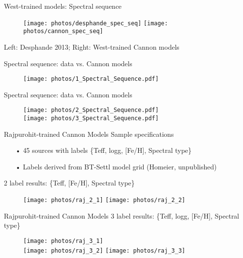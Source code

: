 \documentclass[compress]{beamer}
\begin{document}
\begin{frame}{West-trained models: Spectral sequence}
\begin{figure}
	\texttt{[image: photos/desphande\_spec\_seq]} 
	\texttt{[image: photos/cannon\_spec\_seq]} 
\end{figure}
\small \textcolor{sthlmDarkGreen}{Left}: Desphande 2013; \textcolor{sthlmDarkGreen}{Right}: West-trained Cannon models
\end{frame}


\begin{frame}{Spectral sequence: data vs. Cannon models}
\begin{figure}
	\texttt{[image: photos/1\_Spectral\_Sequence.pdf]} 
\end{figure}
\end{frame}


\begin{frame}{Spectral sequence: data vs. Cannon models}
\begin{figure}
	\texttt{[image: photos/2\_Spectral\_Sequence.pdf]}  \\
	\texttt{[image: photos/3\_Spectral\_Sequence.pdf]}  
\end{figure}
\end{frame}


\begin{frame}{Rajpurohit-trained Cannon Models}
Sample specifications
\begin{enumerate} 
	\item[•] \textcolor{sthlmDarkGreen}{45 sources} with labels \textcolor{sthlmDarkGreen}{\{Teff, logg, [Fe/H], Spectral type\}}
	\item[•] Labels derived from BT-Settl model grid (Homeier, unpublished)
\end{enumerate}

2 label results: \textcolor{sthlmDarkGreen}{\{Teff, [Fe/H], Spectral type\}}
\begin{figure}
	\texttt{[image: photos/raj\_2\_1]}  
	\texttt{[image: photos/raj\_2\_2]}   
\end{figure}
\end{frame}


\begin{frame}{Rajpurohit-trained Cannon Models}
3 label results: \textcolor{sthlmDarkGreen}{\{Teff, logg, [Fe/H], Spectral type\}}
\begin{figure}
	\texttt{[image: photos/raj\_3\_1]}  \\
	\texttt{[image: photos/raj\_3\_2]}  
	\texttt{[image: photos/raj\_3\_3]} 
\end{figure}
\end{frame}
\end{document}
